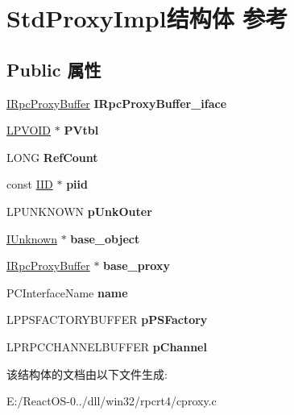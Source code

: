 \hypertarget{struct_std_proxy_impl}{}\section{Std\+Proxy\+Impl结构体 参考}
\label{struct_std_proxy_impl}
\subsection*{Public 属性}
\begin{DoxyCompactItemize}
\item 
\mbox{\label{struct_std_proxy_impl_af2707590da484b1cfb7780c51bbcfb3b}} 
\hyperlink{interface_i_rpc_proxy_buffer}{I\+Rpc\+Proxy\+Buffer} {\bfseries I\+Rpc\+Proxy\+Buffer\+\_\+iface}
\item 
\mbox{\label{struct_std_proxy_impl_ad0da10b3c5f72ec07fde0554bd08579b}} 
\hyperlink{interfacevoid}{L\+P\+V\+O\+ID} $\ast$ {\bfseries P\+Vtbl}
\item 
\mbox{\label{struct_std_proxy_impl_a2acdc919e886af132777052ea4432516}} 
L\+O\+NG {\bfseries Ref\+Count}
\item 
\mbox{\label{struct_std_proxy_impl_a2365f663afa5d2092ce9696f00b4036c}} 
const \hyperlink{struct___i_i_d}{I\+ID} $\ast$ {\bfseries piid}
\item 
\mbox{\label{struct_std_proxy_impl_aa4ba32fcc7f2beba41a5051368deb061}} 
L\+P\+U\+N\+K\+N\+O\+WN {\bfseries p\+Unk\+Outer}
\item 
\mbox{\label{struct_std_proxy_impl_addff7cc42120fff4173142514956470b}} 
\hyperlink{interface_i_unknown}{I\+Unknown} $\ast$ {\bfseries base\+\_\+object}
\item 
\mbox{\label{struct_std_proxy_impl_a864def05af5e7ae577e1c4c23de6de02}} 
\hyperlink{interface_i_rpc_proxy_buffer}{I\+Rpc\+Proxy\+Buffer} $\ast$ {\bfseries base\+\_\+proxy}
\item 
\mbox{\label{struct_std_proxy_impl_a18d95c83e904ee0e27747d961d80e329}} 
P\+C\+Interface\+Name {\bfseries name}
\item 
\mbox{\label{struct_std_proxy_impl_ad0e74a90f521803e47134ebd4874ca16}} 
L\+P\+P\+S\+F\+A\+C\+T\+O\+R\+Y\+B\+U\+F\+F\+ER {\bfseries p\+P\+S\+Factory}
\item 
\mbox{\label{struct_std_proxy_impl_a38dd3cb64a70d9ebd8e87ef38ea2c3e4}} 
L\+P\+R\+P\+C\+C\+H\+A\+N\+N\+E\+L\+B\+U\+F\+F\+ER {\bfseries p\+Channel}
\end{DoxyCompactItemize}


该结构体的文档由以下文件生成\+:\begin{DoxyCompactItemize}
\item 
E\+:/\+React\+O\+S-\/0../dll/win32/rpcrt4/cproxy.\+c\end{DoxyCompactItemize}
